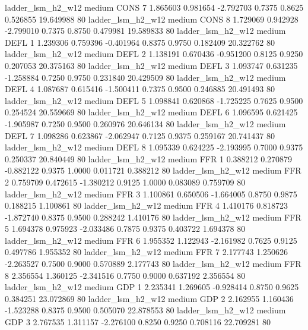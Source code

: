      ladder_lsm_h2_w12     medium     CONS                 7  1.865603 0.981654 -2.792703 0.7375 0.8625  0.526855   19.649988 80
     ladder_lsm_h2_w12     medium     CONS                 8  1.729069 0.942928 -2.799010 0.7375 0.8750  0.479981   19.589833 80
     ladder_lsm_h2_w12     medium     DEFL                 1  1.239306 0.759396 -0.401964 0.8375 0.9750  0.182409   20.322762 80
     ladder_lsm_h2_w12     medium     DEFL                 2  1.138191 0.670436 -0.951200 0.8125 0.9250  0.207053   20.375163 80
     ladder_lsm_h2_w12     medium     DEFL                 3  1.093747 0.631235 -1.258884 0.7250 0.9750  0.231840   20.429509 80
     ladder_lsm_h2_w12     medium     DEFL                 4  1.087687 0.615416 -1.500411 0.7375 0.9500  0.246885   20.491493 80
     ladder_lsm_h2_w12     medium     DEFL                 5  1.098841 0.620868 -1.725225 0.7625 0.9500  0.254524   20.559669 80
     ladder_lsm_h2_w12     medium     DEFL                 6  1.096595 0.621425 -1.905987 0.7250 0.9500  0.260976   20.646134 80
     ladder_lsm_h2_w12     medium     DEFL                 7  1.098286 0.623867 -2.062947 0.7125 0.9375  0.259167   20.741437 80
     ladder_lsm_h2_w12     medium     DEFL                 8  1.095339 0.624225 -2.193995 0.7000 0.9375  0.250337   20.840449 80
     ladder_lsm_h2_w12     medium      FFR                 1  0.388212 0.270879 -0.882122 0.9375 1.0000  0.011721    0.388212 80
     ladder_lsm_h2_w12     medium      FFR                 2  0.759709 0.472615 -1.380212 0.9125 1.0000  0.083089    0.759709 80
     ladder_lsm_h2_w12     medium      FFR                 3  1.100861 0.650506 -1.664005 0.8750 0.9875  0.188215    1.100861 80
     ladder_lsm_h2_w12     medium      FFR                 4  1.410176 0.818723 -1.872740 0.8375 0.9500  0.288242    1.410176 80
     ladder_lsm_h2_w12     medium      FFR                 5  1.694378 0.975923 -2.033486 0.7875 0.9375  0.403722    1.694378 80
     ladder_lsm_h2_w12     medium      FFR                 6  1.955352 1.122943 -2.161982 0.7625 0.9125  0.497786    1.955352 80
     ladder_lsm_h2_w12     medium      FFR                 7  2.177743 1.250626 -2.263527 0.7500 0.9000  0.570889    2.177743 80
     ladder_lsm_h2_w12     medium      FFR                 8  2.356554 1.360125 -2.341516 0.7750 0.9000  0.637192    2.356554 80
     ladder_lsm_h2_w12     medium      GDP                 1  2.235341 1.269605 -0.928414 0.8750 0.9625  0.384251   23.072869 80
     ladder_lsm_h2_w12     medium      GDP                 2  2.162955 1.160436 -1.523288 0.8375 0.9500  0.505070   22.878553 80
     ladder_lsm_h2_w12     medium      GDP                 3  2.767535 1.311157 -2.276100 0.8250 0.9250  0.708116   22.709281 80
